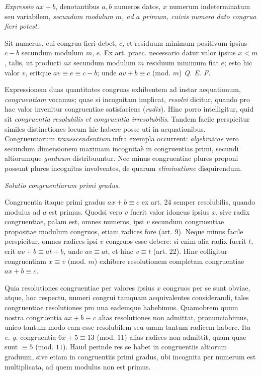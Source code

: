 

\emph{Expressio $ax+b$}, denotantibus $a, b$ numeros datos, $x$ numerum indeterminatum seu
variabilem, \emph{secundum modulum $m$, ad $a$ primum, cuivis numero dato congrua fieri potest.}

Sit numerus, cui congrua fieri debet, $c$, et residuum minimum positivum ipsius $c-b$
secundum modulum $m$, $e$. Ex art. praec. necessario datur valor ipsius $x < m$, talis, ut
producti $ax$ secundum modulum $m$ residuum minimum fiat $e$; esto hic valor $v$, eritque
$av \equiv e \equiv c-b$; unde $av+b \equiv c$ (mod. $m$) \emph{Q. E. F.}


Expressionem duas quantitates congruas exhibentem ad instar aequationum,
\emph{congruentiam} vocamus; quae si incognitam implicat, \emph{resolvi} dicitur, quando
pro hac valor invenitur congruentiae satisfaciens (\emph{radix}). Hinc porro intelligitur,
quid sit \emph{congruentia resolubilis et congruentia irresolubilis}. Tandem facile
perspicitur similes distinctiones locum hic habere posse uti in aequationibus.
Congruentiarum \emph{transscendentium} 
infra exempla occurrent: \emph{algebraicae} vero secundum dimensionem maximam
incognitaè 
in congruentias primi, secundi altiorumque \emph{graduum} distribuuntur. Nec minus
congruentiae plures proponi possunt plures incognitas involventes, de quarum
\emph{eliminatione} disquirendum.

\begin{center}
\emph{Solutio congruentiarum primi gradus.}
\end{center}


Congruentia itaque primi gradus $ax+b \equiv c$ ex art. 24 semper resolubilis, quando
modulus ad $a$ est primus. Quodsi vero $v$ fuerit valor idoneus ipsius $x$, sive radix
congruentiae, palam est, omnes numeros, ipsi $v$ secundum congruentiae propositae modulum
congruos, etiam radices fore (art. 9). Neque minus facile perspicitur, omnes radices ipsi
$v$ congruos esse debere: si enim alia radix fuerit $t$, erit $av+b \equiv at+b$, unde
$av \equiv at$, et hinc $v \equiv t$ (art. 22). Hinc colligitur congruentiam
$x \equiv v$ (mod. $m$) exhibere resolutionem completam congruentiae $ax+b \equiv c$.

Quia resolutiones congruentiae per valores ipsius $x$ congruos per se sunt obviae, atque,
hoc respectu, numeri congrui tamquam aequivalentes considerandi, tales congruentiae
resolutiones pro una eademque habebimus. Quamobrem quum
nostra congruentia $ax+b \equiv c$ alias resolutiones non admittat, pronunciabimus, unico
tantum modo eam esse resolubilem seu unam tantum radicem habere. Ita \emph{e. g.}
congruentia $6x+5 \equiv 13$ (mod. $11$) alias radices non admittit, quam quae sunt
$\equiv 5$ (mod. $11$). Haud perinde res se habet in congruentiis altiorum graduum, sive
etiam in congruentiis primi gradus, ubi incognita per numerum est multiplicata, ad quem
modulus non est primus.

